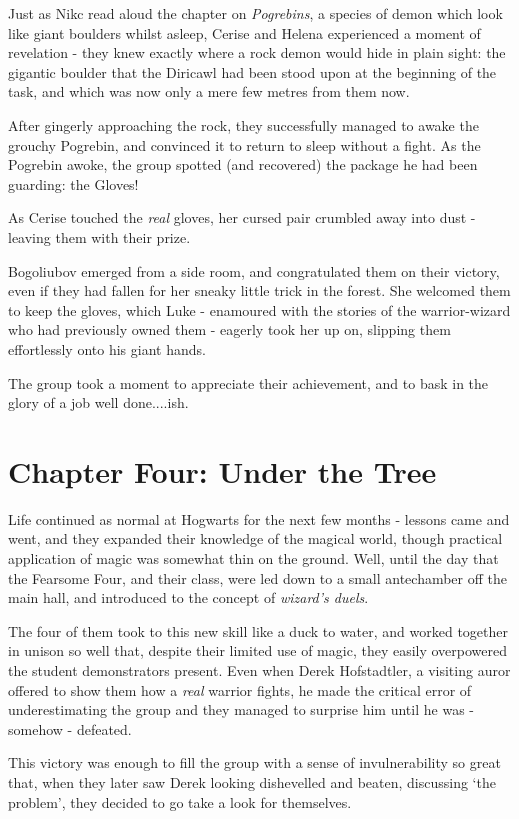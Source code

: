 \documentclass[oneside]{book}
\begin{document}
Just as Nikc read aloud the chapter on {\it Pogrebins}, a species of demon which look like giant boulders whilst asleep, Cerise and Helena experienced a moment of revelation - they knew exactly where a rock demon would hide in plain sight: the gigantic boulder that the Diricawl had been stood upon at the beginning of the task, and which was now only a mere few metres from them now.  

After gingerly approaching the rock, they successfully managed to awake the grouchy Pogrebin, and convinced it to return to sleep without a fight. As the Pogrebin awoke, the group spotted (and recovered) the package he had been guarding: the Gloves!

As Cerise touched the {\it real} gloves, her cursed pair crumbled away into dust - leaving them with their prize. 

Bogoliubov emerged from a side room, and congratulated them on their victory, even if they had fallen for her sneaky little trick in the forest. She welcomed them to keep the gloves, which Luke - enamoured with the stories of the warrior-wizard who had previously owned them - eagerly took her up on, slipping them effortlessly onto his giant hands. 

The group took a moment to appreciate their achievement, and to bask in the glory of a job well done....ish. 

\section{Chapter Four: Under the Tree}

Life continued as normal at Hogwarts for the next few months - lessons came and went, and they expanded their knowledge of the magical world, though practical application of magic was somewhat thin on the ground. Well, until the day that the Fearsome Four, and their class, were led down to a small antechamber off the main hall, and introduced to the concept of {\it wizard's duels}. 

The four of them took to this new skill like a duck to water, and worked together in unison so well that, despite their limited use of magic, they easily overpowered the student demonstrators present. Even when Derek Hofstadtler, a visiting auror offered to show them how a {\it real} warrior fights, he made the critical error of underestimating the group and they managed to surprise him until he was - somehow - defeated. 

This victory was enough to fill the group with a sense of invulnerability so great that, when they later saw Derek looking dishevelled and beaten, discussing `the problem', they decided to go take a look for themselves. 
\end{document}
